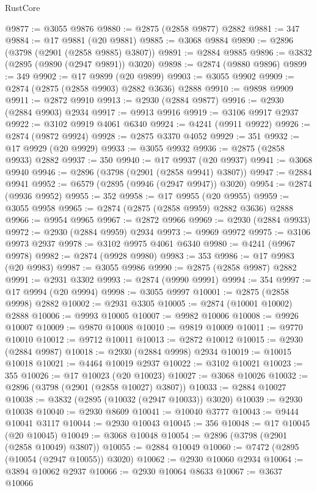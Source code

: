 \begin{lexlean}{RustCore}
\begin{coremodule}
@9877 := @3055 @9876
@9880 := @2875 (@2858 @9877) @2882
@9881 := 347
@9884 := @17 @9881 (@20 @9881)
@9885 := @3068 @9884
@9890 := @2896 (@3798 (@2901 (@2858 @9885) @3807))
@9891 := @2884 @9885
@9896 := @3832 (@2895 (@9890 (@2947 @9891)) @3020)
@9898 := @2874 (@9880 @9896)
@9899 := 349
@9902 := @17 @9899 (@20 @9899)
@9903 := @3055 @9902
@9909 := @2874 (@2875 (@2858 @9903) @2882 @3636) @2888
@9910 := @9898 @9909
@9911 := @2872 @9910
@9913 := @2930 (@2884 @9877)
@9916 := @2930 (@2884 @9903) @2934
@9917 := @9913 @9916
@9919 := @3106 @9917 @2937
@9922 := @3102 @9919 @4061 @6340
@9924 := @4241 (@9911 @9922)
@9926 := @2874 (@9872 @9924)
@9928 := @2875 @3370 @4052
@9929 := 351
@9932 := @17 @9929 (@20 @9929)
@9933 := @3055 @9932
@9936 := @2875 (@2858 @9933) @2882
@9937 := 350
@9940 := @17 @9937 (@20 @9937)
@9941 := @3068 @9940
@9946 := @2896 (@3798 (@2901 (@2858 @9941) @3807))
@9947 := @2884 @9941
@9952 := @6579 (@2895 (@9946 (@2947 @9947)) @3020)
@9954 := @2874 (@9936 @9952)
@9955 := 352
@9958 := @17 @9955 (@20 @9955)
@9959 := @3055 @9958
@9965 := @2874 (@2875 (@2858 @9959) @2882 @3636) @2888
@9966 := @9954 @9965
@9967 := @2872 @9966
@9969 := @2930 (@2884 @9933)
@9972 := @2930 (@2884 @9959) @2934
@9973 := @9969 @9972
@9975 := @3106 @9973 @2937
@9978 := @3102 @9975 @4061 @6340
@9980 := @4241 (@9967 @9978)
@9982 := @2874 (@9928 @9980)
@9983 := 353
@9986 := @17 @9983 (@20 @9983)
@9987 := @3055 @9986
@9990 := @2875 (@2858 @9987) @2882
@9991 := @2931 @3302
@9993 := @2874 (@9990 @9991)
@9994 := 354
@9997 := @17 @9994 (@20 @9994)
@9998 := @3055 @9997
@10001 := @2875 (@2858 @9998) @2882
@10002 := @2931 @3305
@10005 := @2874 (@10001 @10002) @2888
@10006 := @9993 @10005
@10007 := @9982 @10006
@10008 := @9926 @10007
@10009 := @9870 @10008
@10010 := @9819 @10009
@10011 := @9770 @10010
@10012 := @9712 @10011
@10013 := @2872 @10012
@10015 := @2930 (@2884 @9987)
@10018 := @2930 (@2884 @9998) @2934
@10019 := @10015 @10018
@10021 := @4464 @10019 @2937
@10022 := @3102 @10021
@10023 := 355
@10026 := @17 @10023 (@20 @10023)
@10027 := @3068 @10026
@10032 := @2896 (@3798 (@2901 (@2858 @10027) @3807))
@10033 := @2884 @10027
@10038 := @3832 (@2895 (@10032 (@2947 @10033)) @3020)
@10039 := @2930 @10038
@10040 := @2930 @8609
@10041 := @10040 @3777
@10043 := @9444 @10041 @3117
@10044 := @2930 @10043
@10045 := 356
@10048 := @17 @10045 (@20 @10045)
@10049 := @3068 @10048
@10054 := @2896 (@3798 (@2901 (@2858 @10049) @3807))
@10055 := @2884 @10049
@10060 := @7472 (@2895 (@10054 (@2947 @10055)) @3020)
@10062 := @2930 @10060 @2934
@10064 := @3894 @10062 @2937
@10066 := @2930 @10064 @8633
@10067 := @3637 @10066

\end{coremodule}
\end{lexlean}
